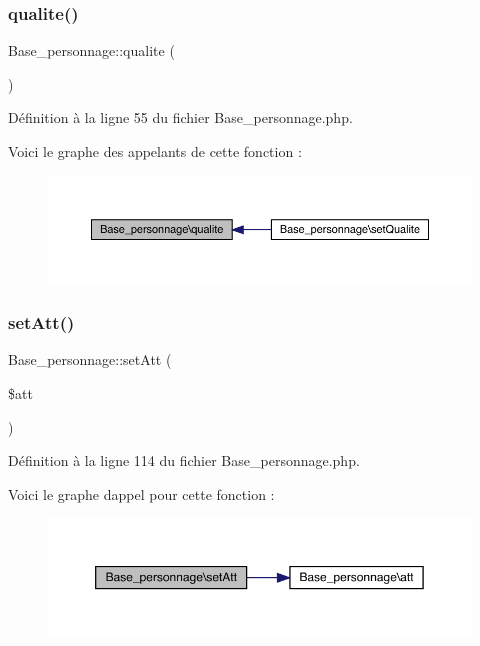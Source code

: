 \subsubsection{\texorpdfstring{qualite()}{qualite()}}
{\footnotesize\ttfamily Base\+\_\+personnage\+::qualite (\begin{DoxyParamCaption}{ }\end{DoxyParamCaption})}



Définition à la ligne 55 du fichier Base\+\_\+personnage.\+php.

Voici le graphe des appelants de cette fonction \+:\nopagebreak
\begin{figure}[H]
\begin{center}
\leavevmode
\includegraphics[width=350pt]{class_base__personnage_a77daa43282aa9b4653c70b4a97dc7948_icgraph}
\end{center}
\end{figure}
\mbox{\label{class_base__personnage_a4c64fc057282c154957efe45c601f551}} 
\subsubsection{\texorpdfstring{set\+Att()}{setAtt()}}
{\footnotesize\ttfamily Base\+\_\+personnage\+::set\+Att (\begin{DoxyParamCaption}\item[{}]{\$att }\end{DoxyParamCaption})}



Définition à la ligne 114 du fichier Base\+\_\+personnage.\+php.

Voici le graphe d\textquotesingle{}appel pour cette fonction \+:\nopagebreak
\begin{figure}[H]
\begin{center}
\leavevmode
\includegraphics[width=350pt]{class_base__personnage_a4c64fc057282c154957efe45c601f551_cgraph}
\end{center}
\end{figure}
\mbox{\label{class_base__personnage_a8aeece8f59864d993f5a571bac2d4dd6}} 
